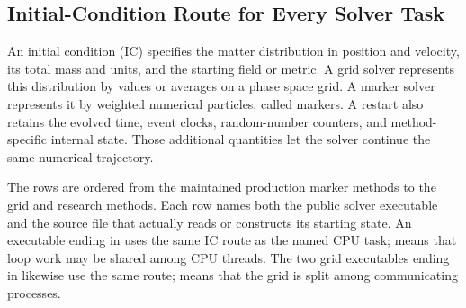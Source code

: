 \subsection{Initial-Condition Route for Every Solver Task}

An initial condition (IC) specifies the matter distribution in position and
velocity, its total mass and units, and the starting field or metric. A grid
solver represents this distribution by values or averages on a phase space
grid. A marker solver represents it by weighted numerical particles, called
markers. A restart also retains the evolved time, event clocks,
random-number counters, and method-specific internal state. Those additional
quantities let the solver continue the same numerical trajectory.

The rows are ordered from the maintained production marker methods to the
grid and research methods.  Each row names both the public solver executable
and the source file that actually reads or constructs its starting state.
An executable ending in  uses the same IC route as the named CPU
task;  means that loop work may be shared among CPU threads.
The two grid executables ending in  likewise use the same route;
 means that the grid is split among communicating processes.

